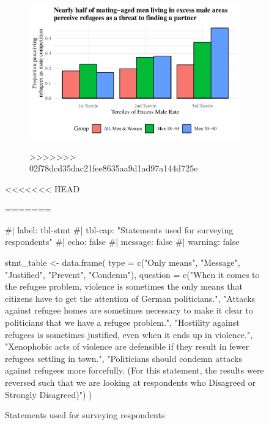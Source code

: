 \documentclass[
]{article}
\newenvironment{Shaded}{\begin{snugshade}}{\end{snugshade}}
\newcommand{\AttributeTok}[1]{\textcolor[rgb]{0.40,0.45,0.13}{#1}}
\newcommand{\CommentTok}[1]{\textcolor[rgb]{0.37,0.37,0.37}{#1}}
\newcommand{\FunctionTok}[1]{\textcolor[rgb]{0.28,0.35,0.67}{#1}}
\newcommand{\NormalTok}[1]{\textcolor[rgb]{0.00,0.23,0.31}{#1}}
\newcommand{\OtherTok}[1]{\textcolor[rgb]{0.00,0.23,0.31}{#1}}
\newcommand{\StringTok}[1]{\textcolor[rgb]{0.13,0.47,0.30}{#1}}
\begin{document}
\begin{figure}
\begin{figure}[H]

{\centering \includegraphics{paper_files/figure-pdf/unnamed-chunk-2-1.pdf}

}

>>>>>>> 02f78dcd35dac21fee8635aa9d1ad97a144d725e
\end{figure}

\clearpage

<<<<<<< HEAD
\hypertarget{tbl-stmt}{}
\begin{table}
\caption{\label{tbl-stmt}Statements used for surveying respondents }\tabularnewline

\centering
=======
\begin{Shaded}
\begin{Highlighting}[]
\CommentTok{\#| label: tbl{-}stmt}
\CommentTok{\#| tbl{-}cap: "Statements used for surveying respondents"}
\CommentTok{\#| echo: false}
\CommentTok{\#| message: false}
\CommentTok{\#| warning: false}

\NormalTok{stmt\_table }\OtherTok{\textless{}{-}} \FunctionTok{data.frame}\NormalTok{(}
  \AttributeTok{type =} \FunctionTok{c}\NormalTok{(}\StringTok{"Only means"}\NormalTok{, }\StringTok{"Message"}\NormalTok{, }\StringTok{"Justified"}\NormalTok{, }\StringTok{"Prevent"}\NormalTok{, }\StringTok{"Condemn"}\NormalTok{),}
  \AttributeTok{question =} \FunctionTok{c}\NormalTok{(}\StringTok{"When it comes to the refugee problem, violence is sometimes the only means that citizens have to get the attention of German politicians."}\NormalTok{, }
               \StringTok{"Attacks against refugee homes are sometimes necessary to make it clear to politicians that we have a refugee problem."}\NormalTok{,}
               \StringTok{"Hostility against refugees is sometimes justified, even when it ends up in violence."}\NormalTok{,}
               \StringTok{"Xenophobic acts of violence are defensible if they result in fewer refugees settling in town."}\NormalTok{, }
               \StringTok{"Politicians should condemn attacks against refugees more forcefully. (For this statement, the results were reversed such that we are looking at respondents who Disagreed or Strongly Disagreed)"}\NormalTok{)}
\NormalTok{)}


\end{Highlighting}
\end{Shaded}
\end{table}
\end{figure}
\end{document}
